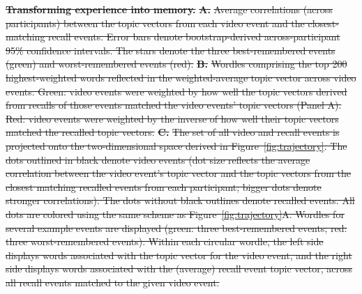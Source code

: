 \documentclass{article}
\providecommand{\DIFdeltex}[1]{{\protect\color{red}\sout{#1}}}                      %
\providecommand{\DIFdelbegin}{} %
\providecommand{\DIFdelFL}[1]{\DIFdel{#1}} %
\providecommand{\DIFdel}[1]{\texorpdfstring{\DIFdeltex{#1}}{}} %
\newcommand{\DIFscaledelfig}{0.5}
\newlength{\DIFdelgraphicswidth} %
\newlength{\DIFdelgraphicsheight} %
\newcommand{\DIFdelincludegraphics}[2][]{%
\sbox{\DIFdelgraphicsbox}{\DIFOincludegraphics[#1]{#2}}%
\settoboxwidth{\DIFdelgraphicswidth}{\DIFdelgraphicsbox} %
\settoboxtotalheight{\DIFdelgraphicsheight}{\DIFdelgraphicsbox} %
\scalebox{\DIFscaledelfig}{%
\parbox[b]{\DIFdelgraphicswidth}{\usebox{\DIFdelgraphicsbox}\\[-\baselineskip] \rule{\DIFdelgraphicswidth}{0em}}\llap{\resizebox{\DIFdelgraphicswidth}{\DIFdelgraphicsheight}{%
\setlength{\unitlength}{\DIFdelgraphicswidth}%
\begin{picture}(1,1)%
\thicklines\linethickness{2pt} %
{\color[rgb]{1,0,0}\put(0,0){\framebox(1,1){}}}%
{\color[rgb]{1,0,0}\put(0,0){\line( 1,1){1}}}%
{\color[rgb]{1,0,0}\put(0,1){\line(1,-1){1}}}%
\end{picture}%
}\hspace*{3pt}}} %
} %
\DeclareRobustCommand{\DIFdelbegin}{\DIFOdelbegin \let\includegraphics\DIFdelincludegraphics} %
\begin{document}
\DIFdelbegin %
{%
\textbf{\DIFdelFL{Transforming experience into memory.}} %
\textbf{\DIFdelFL{A.}} %
\DIFdelFL{Average correlations (across participants) between the topic vectors from each video event and the closest-matching recall events.  Error bars denote bootstrap-derived across-participant 95\% confidence intervals.  The stars denote the three best-remembered events (green) and worst-remembered events (red).  }\textbf{\DIFdelFL{B.}} %
\DIFdelFL{Wordles comprising the top 200 highest-weighted words reflected in the weighted-average topic vector across video events.  Green: video events were weighted by how well the topic vectors derived from recalls of those events matched the video events' topic vectors (Panel A).  Red: video events were weighted by the inverse of how well their topic vectors matched the recalled topic vectors.  }\textbf{\DIFdelFL{C.}}  %
\DIFdelFL{The set of all video and recall events is projected onto the two-dimensional space derived in Figure~\ref{fig:trajectory}.  The dots outlined in black denote video events (dot size reflects the average correlation between the video event's topic vector and the topic vectors from the closest matching recalled events from each participant; bigger dots denote stronger correlations).  The dots without black outlines denote recalled events.  All dots are colored using the same scheme as Figure~\ref{fig:trajectory}A.  Wordles for several example events are displayed (green: three best-remembered events; red: three worst-remembered events).  Within each circular wordle, the left side displays words associated with the topic vector for the video event, and the right side displays words associated with the (average) recall event topic vector, across all recall events matched to the given video event.}}
\end{document}
